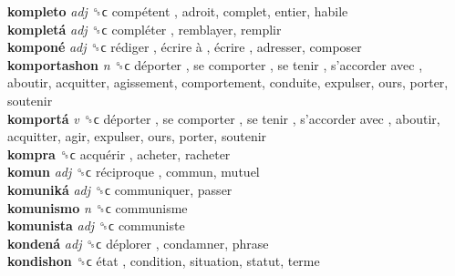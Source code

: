 \textbf{kompleto} \emph{adj}  ␝ϲ   compétent , adroit, complet, entier, habile  \\
\textbf{kompletá} \emph{adj}  ␝ϲ   compléter , remblayer, remplir  \\
\textbf{komponé} \emph{adj}  ␝ϲ   rédiger ,  écrire à ,  écrire , adresser, composer  \\
\textbf{komportashon} \emph{n}  ␝ϲ   déporter ,  se comporter ,  se tenir ,  s’accorder avec , aboutir, acquitter, agissement, comportement, conduite, expulser, ours, porter, soutenir  \\
\textbf{komportá} \emph{v}  ␝ϲ   déporter ,  se comporter ,  se tenir ,  s’accorder avec , aboutir, acquitter, agir, expulser, ours, porter, soutenir  \\
\textbf{kompra} ␝ϲ   acquérir , acheter, racheter  \\
\textbf{komun} \emph{adj}  ␝ϲ   réciproque , commun, mutuel  \\
\textbf{komuniká} \emph{adj}  ␝ϲ  communiquer, passer  \\
\textbf{komunismo} \emph{n}  ␝ϲ  communisme  \\
\textbf{komunista} \emph{adj}  ␝ϲ  communiste  \\
\textbf{kondená} \emph{adj}  ␝ϲ   déplorer , condamner, phrase  \\
\textbf{kondishon} ␝ϲ   état , condition, situation, statut, terme  \\
